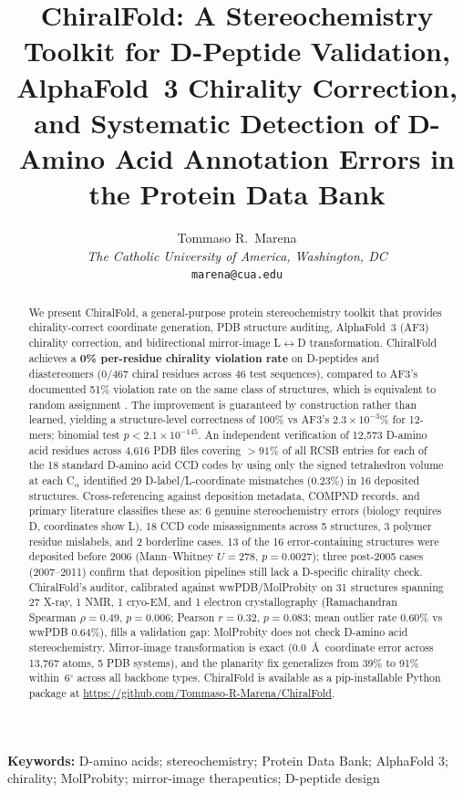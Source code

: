 \documentclass[11pt]{article}
\title{ChiralFold: A Stereochemistry Toolkit for D-Peptide Validation,
AlphaFold~3 Chirality Correction, and Systematic Detection of
D-Amino Acid Annotation Errors in the Protein Data Bank}
\author{Tommaso R.\ Marena\\
\textit{The Catholic University of America, Washington, DC}\\
\texttt{marena@cua.edu}}
\date{}
\begin{document}
\maketitle

\noindent\textbf{Keywords:} D-amino acids; stereochemistry; Protein Data Bank;
AlphaFold 3; chirality; MolProbity; mirror-image therapeutics; D-peptide design

\begin{abstract}
We present ChiralFold, a general-purpose protein stereochemistry toolkit that
provides chirality-correct coordinate generation, PDB structure auditing,
AlphaFold~3 (AF3) chirality correction, and bidirectional mirror-image
L$\leftrightarrow$D transformation. ChiralFold achieves a \textbf{0\%
per-residue chirality violation rate} on D-peptides and diastereomers (0/467
chiral residues across 46 test sequences), compared to AF3's documented 51\%
violation rate on the same class of structures, which is equivalent to random
assignment \citep{childs2025}. The improvement is guaranteed by construction
rather than learned, yielding a structure-level correctness of 100\% vs
AF3's $2.3 \times 10^{-3}$\% for 12-mers; binomial test $p <
2.1 \times 10^{-145}$.
An independent verification of 12,573 D-amino acid residues across 4,616 PDB
files covering ${>}91\%$ of all RCSB entries for each of the 18 standard
D-amino acid CCD codes by using only the signed tetrahedron volume at each
C$_\alpha$ identified 29 D-label/L-coordinate mismatches (0.23\%) in 16
deposited structures. Cross-referencing against deposition metadata, COMPND
records, and primary literature classifies these as: 6 genuine stereochemistry
errors (biology requires D, coordinates show L), 18 CCD code misassignments
across 5 structures, 3 polymer residue mislabels, and 2 borderline cases.
13 of the 16 error-containing structures were deposited before 2006
(Mann--Whitney $U=278$, $p=0.0027$); three post-2005 cases (2007--2011)
confirm that deposition pipelines still lack a D-specific chirality check.
ChiralFold's auditor, calibrated against wwPDB/MolProbity on 31 structures
spanning 27 X-ray, 1 NMR, 1 cryo-EM, and 1 electron crystallography
(Ramachandran Spearman $\rho=0.49$, $p=0.006$; Pearson $r=0.32$, $p=0.083$;
mean outlier rate 0.60\% vs wwPDB 0.64\%), fills a validation gap: MolProbity
does not check D-amino acid stereochemistry. Mirror-image transformation is
exact (0.0~\AA\ coordinate error across 13,767 atoms, 5 PDB systems), and the
planarity fix generalizes from 39\% to 91\% within~6$^\circ$ across all
backbone types. ChiralFold is available as a pip-installable Python package at
\url{https://github.com/Tommaso-R-Marena/ChiralFold}.
\end{abstract}
\end{document}
